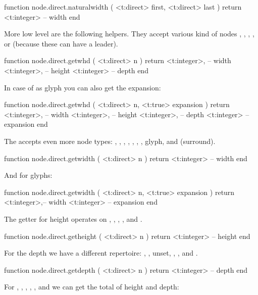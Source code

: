 \starttyping[option=LUA]
function node.direct.naturalwidth (
    <t:direct> first,
    <t:direct> last
)
    return <t:integer> -- width
end
\stoptyping

More low level are the following helpers. They accept various kind of nodes
, , , ,  or 
(because these can have a leader).

\starttyping[option=LUA]
function node.direct.getwhd ( <t:direct> n )
    return
        <t:integer>, -- width
        <t:integer>, -- height
        <t:integer>  -- depth
end
\stoptyping

In case of as glyph you can also get the expansion:

\starttyping[option=LUA]
function node.direct.getwhd ( <t:direct> n, <t:true> expansion )
    return
        <t:integer>, -- width
        <t:integer>, -- height
        <t:integer>, -- depth
        <t:integer>  -- expansion
end
\stoptyping

The  accepts even more node types: , ,
, , , , , \type
{glyph},  and  (surround).

\starttyping[option=LUA]
function node.direct.getwidth ( <t:direct> n )
    return <t:integer> -- width
end
\stoptyping

And for glyphs:

\starttyping[option=LUA]
function node.direct.getwidth ( <t:direct> n, <t:true> expansion )
    return
        <t:integer>,-- width
        <t:integer> -- expansion
end
\stoptyping

The getter for height operates on , , ,
,  and .

\starttyping[option=LUA]
function node.direct.getheight ( <t:direct> n )
    return <t:integer> -- height
end
\stoptyping

For the depth we have a different repertoire: , , \type
{unset}, , ,  and .

\starttyping[option=LUA]
function node.direct.getdepth ( <t:direct> n )
    return <t:integer> -- depth
end
\stoptyping

For , , , , ,
 and  we can get the total of height and depth:

